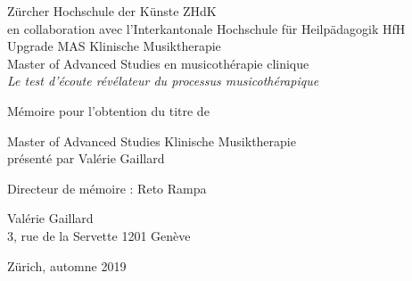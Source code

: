 
\begin{titlepage}
 \begin{center}
    \Large
     Zürcher Hochschule der Künste ZHdK\\
 	en collaboration avec l'Interkantonale Hochschule für
        Heilpädagogik HfH \\
	 Upgrade MAS Klinische Musiktherapie \\ Master of Advanced Studies en musicothérapie clinique\\
  \vfill
  { \LARGE
\emph{Le test d'écoute révélateur du processus musicothérapique }\\ \bigskip
	 }
 \vfill
 
Mémoire pour l'obtention du titre de

Master of Advanced Studies Klinische Musiktherapie \\ présenté par Valérie Gaillard

{\large Directeur de mémoire : Reto Rampa}


 {\large

	 Valérie Gaillard \\ 3, rue de la Servette   \hfill 1201 Genève\\
	 \rule{0mm}{1pt} \hfill Zürich, automne 2019}
 \end{center}
\end{titlepage}
